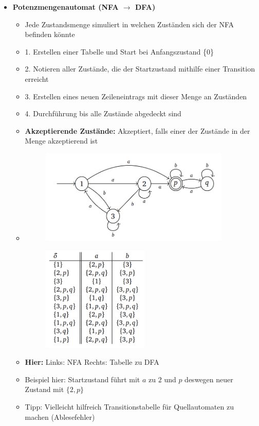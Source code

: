 \documentclass[11pt,a4paper]{article}
\begin{document}
\begin{itemize}
		
\item {\large \textbf{Potenzmengenautomat (NFA $\rightarrow$ DFA)}}
	\begin{itemize}
	\item Jede Zustandsmenge simuliert in welchen Zuständen sich der NFA befinden könnte
	\item 1. Erstellen einer Tabelle und Start bei Anfangszustand \{0\}
	\item 2. Notieren aller Zustände, die der Startzustand mithilfe einer Transition erreicht
	\item 3. Erstellen eines neuen Zeileneintrags mit dieser Menge an Zuständen
	\item 4. Durchführung bis alle Zustände abgedeckt sind
	\item \textbf{Akzeptierende Zustände:} Akzeptiert, falls einer der Zustände in der Menge akzeptierend ist
	\item[]
		\begin{minipage}{0.55\textwidth}
				\begin{figure}[H]
				\includegraphics[height=4.5cm]{potenz1}
				\end{figure}
			\end{minipage}
			\begin{minipage}[t]{0.35\textwidth}
				\vspace{-2.25cm}
				\begin{figure}[H]
				\includegraphics[height=5cm]{potenz2}
				\end{figure}
			\end{minipage}
	\item \textbf{Hier:} Links: NFA    Rechts: Tabelle zu DFA
	\item Beispiel hier: Startzustand führt mit $a$ zu $2$ und $p$ deswegen neuer Zustand mit $\{2,p\}$	
	\item Tipp: Vielleicht hilfreich Transitionstabelle für Quellautomaten zu machen (Ablesefehler)
	

\end{itemize}
\end{itemize}
\end{document}
